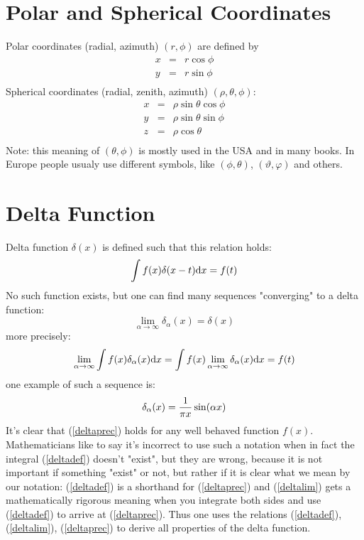 \section{Polar and Spherical Coordinates}

Polar coordinates (radial, azimuth) $(r,\phi)$ are defined by 
\begin{eqnarray*}
x&=&r\cos\phi \\
y&=&r\sin\phi \\
\end{eqnarray*}
 Spherical coordinates (radial, zenith, azimuth) $(\rho,\theta,\phi)$: 
\begin{eqnarray*}
x&=&\rho\sin\theta\cos\phi \\
y&=&\rho\sin\theta\sin\phi \\
z&=&\rho\cos\theta \\
\end{eqnarray*}
 Note: this meaning of $(\theta,\phi)$ is mostly used in the USA and in many books. In Europe people usualy use different symbols, like $(\phi,\theta)$, $(\vartheta,\varphi)$ and others.

\section{Delta Function}

Delta function $\delta(x)$ is defined such that this relation holds: 
\begin{equation}
  \int f(x)\delta(x-t){\rm d} x=f(t)  \label{deltadef}
\end{equation}
No such function exists, but one can find many sequences "converging" to a delta function: 
\begin{equation}
  \lim_{\alpha\to\infty}\delta_\alpha(x) = \delta(x)  \label{deltalim}
\end{equation}
more precisely: 
\begin{equation}
  \lim_{\alpha\to\infty}\int f(x)\delta_\alpha(x){\rm d} x = \int f(x)\lim_{\alpha\to\infty}\delta_\alpha(x){\rm d} x = f(t)  \label{deltaprec}
\end{equation}
one example of such a sequence is: 
\begin{equation*}
  \delta_\alpha(x) = {1\over\pi x}\sin(\alpha x)
\end{equation*}
It's clear that (\ref{deltaprec}) holds for any well behaved function $f(x)$. Mathematicians like to say it's incorrect to use such a notation when in fact the integral (\ref{deltadef}) doesn't "exist", but they are wrong, because it is not important if something "exist" or not, but rather if it is clear what we mean by our notation: (\ref{deltadef}) is a shorthand for (\ref{deltaprec}) and (\ref{deltalim}) gets a mathematically rigorous meaning when you integrate both sides and use (\ref{deltadef}) to arrive at (\ref{deltaprec}). Thus one uses the relations (\ref{deltadef}), (\ref{deltalim}), (\ref{deltaprec}) to derive all properties of the delta function.

